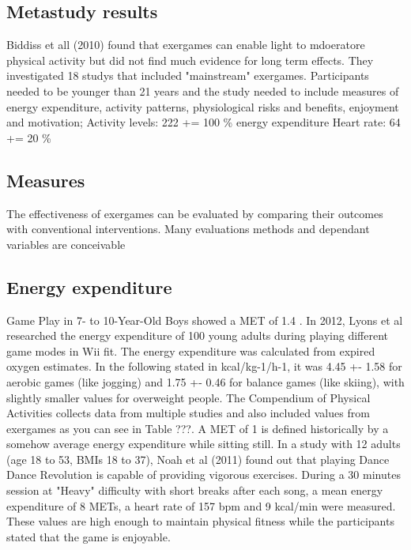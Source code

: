 \subsection{Metastudy results}

Biddiss et all (2010) \cite{biddiss2010active} found that exergames can enable light to mdoeratore physical activity but did not find much evidence for long term effects. They investigated 18 studys that included "mainstream" exergames. Participants needed to be younger than 21 years and the study needed to include measures of energy expenditure, activity patterns, physiological risks and benefits, enjoyment and motivation; 
 Activity levels: 222 += 100 \% energy expenditure
 Heart rate: 64 += 20 \%





\subsection{Measures}
The effectiveness of exergames can be evaluated by comparing their outcomes with conventional interventions. Many evaluations methods and dependant variables are conceivable 

\subsection{Energy expenditure}
Game Play in 7- to 10-Year-Old Boys showed a MET of 1.4 \cite{ainsworth20112011}.
In 2012, Lyons et al \cite{lyons2012novel} researched the energy expenditure of 100 young adults during playing different game modes in Wii fit. The energy expenditure was calculated from expired oxygen estimates. In the following stated in kcal/kg-1/h-1, it was 4.45 +- 1.58 for aerobic games (like jogging) and 1.75 +- 0.46 for balance games (like skiing), with slightly smaller values for overweight people. The Compendium of Physical Activities \cite{ainsworth20112011} collects data from multiple studies and also included values from exergames as you can see in Table ???. A MET of 1 is defined historically by a somehow average energy expenditure while sitting still.
In a study with 12 adults (age 18 to 53, BMIs 18 to 37), Noah et al (2011) \cite{noah2011vigorous} found out that playing Dance Dance Revolution is capable of providing vigorous exercises. During a 30 minutes session at "Heavy" difficulty with short breaks after each song, a mean energy expenditure of 8 METs, a heart rate of 157 bpm and 9 kcal/min were measured. These values are high enough to maintain physical fitness while the participants stated that the game is enjoyable. 


